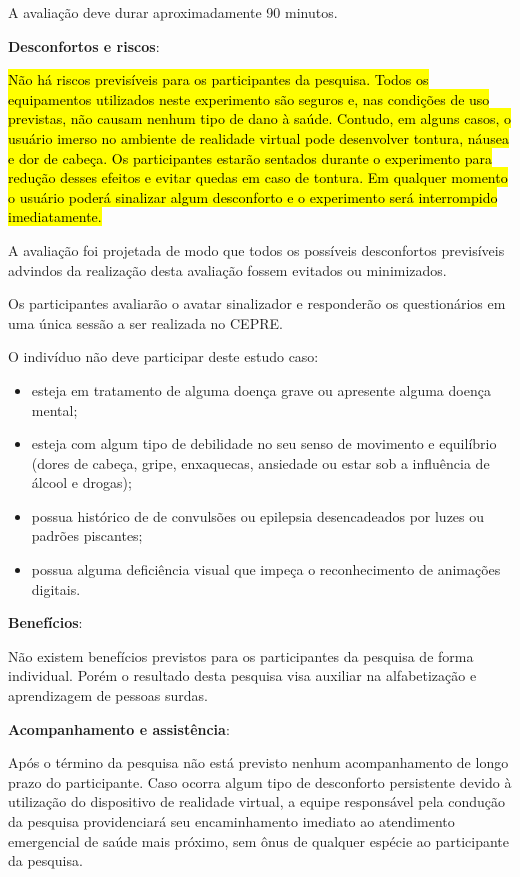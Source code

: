\documentclass[a4paper, 12pt]{article}
\begin{document}
A avaliação deve durar aproximadamente 90 minutos.

\vspace{10pt}
\textbf{Desconfortos e riscos}:

\hl{Não há riscos previsíveis para os participantes da pesquisa. Todos os equipamentos utilizados neste experimento são seguros e, nas condições de uso previstas, não causam nenhum tipo de dano à saúde. Contudo, em alguns casos, o usuário imerso no ambiente de realidade virtual pode desenvolver tontura, náusea e dor de cabeça. Os participantes estarão sentados durante o experimento para redução desses efeitos e evitar quedas em caso de tontura. Em qualquer momento o usuário poderá sinalizar algum desconforto e o experimento será interrompido imediatamente.}

A avaliação foi projetada de modo que todos os possíveis desconfortos previsíveis advindos da realização desta avaliação fossem evitados ou minimizados.

Os participantes avaliarão o avatar sinalizador e responderão os questionários em uma única sessão a ser realizada no CEPRE.

O indivíduo não deve participar deste estudo caso:

\begin{itemize}
\item esteja em tratamento de alguma doença grave ou apresente alguma doença mental;
\item esteja com algum tipo de debilidade no seu senso de movimento e equilíbrio (dores de cabeça, gripe, enxaquecas, ansiedade ou estar sob a influência de álcool e drogas);
\item possua histórico de de convulsões ou epilepsia desencadeados por luzes ou padrões piscantes;
\item possua alguma deficiência visual que impeça o reconhecimento de animações digitais.
\end{itemize}

\vspace{10pt}
\textbf{Benefícios}:

Não existem benefícios previstos para os participantes da pesquisa de forma individual. Porém o resultado desta pesquisa visa auxiliar na alfabetização e aprendizagem de pessoas surdas.

\vspace{10pt}
\textbf{Acompanhamento e assistência}:

Após o término da pesquisa não está previsto nenhum acompanhamento de longo prazo do participante. Caso ocorra algum tipo de desconforto persistente devido à utilização do dispositivo de realidade virtual, a equipe responsável pela condução da pesquisa providenciará seu encaminhamento imediato ao atendimento emergencial de saúde mais próximo, sem ônus de qualquer espécie ao participante da pesquisa.
\end{document}
